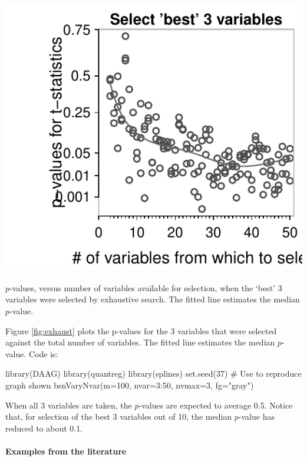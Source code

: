 \begin{marginfigure}[-84pt]
\begin{Schunk}


\centerline{\includegraphics[width=\textwidth]{figs/8-bsnVary-1} }

\end{Schunk}
\caption{$p$-values, versus number of variables available for selection,
  when the `best' 3 variables were selected by exhaustive search.
  The fitted line estimates the median $p$-value.\label{fig:exhaust}}
\end{marginfigure}
\noindent

Figure \ref{fig:exhaust} plots the p-values for the 3 variables that
were selected against the total number of variables. The fitted line
estimates the median $p$-value.
Code is:
\begin{Schunk}
\begin{Sinput}
library(DAAG)
library(quantreg)
library(splines)
set.seed(37)   # Use to reproduce graph shown
bsnVaryNvar(m=100, nvar=3:50, nvmax=3, fg="gray")
\end{Sinput}
\end{Schunk}

When all 3 variables are taken, the $p$-values are expected to average
0.5.  Notice that, for selection of the best 3 variables out of 10,
the median $p$-value has reduced to about 0.1.

\paragraph{Examples from the literature}


